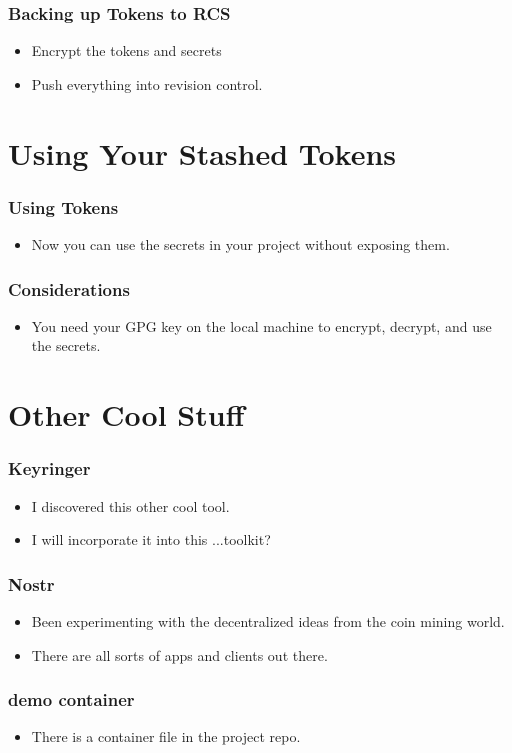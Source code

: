 \documentclass[aspectratio=169]{beamer}
\makeatletter
\def\sectionsubtitle#1{\gdef\@sectionsubtitle{#1}}
\gdef\@sectionsubtitle{}
\makeatother
\begin{document}
\begin{frame}
	\frametitle{Backing up Tokens to RCS}
	\begin{itemize}
		\item Encrypt the tokens and secrets
		\item Push everything into revision control.
	\end{itemize}
\end{frame}

\sectionsubtitle{How to Use What You Built}
\section{Using Your Stashed Tokens}

\begin{frame}
	\frametitle{Using Tokens}
	\begin{itemize}
		\item Now you can use the secrets in your project without exposing them.
	\end{itemize}
\end{frame}

\begin{frame}
	\frametitle{Considerations}
	\begin{itemize}
		\item You need your GPG key on the local machine to encrypt, decrypt, and use the secrets.
	\end{itemize}
\end{frame}

\sectionsubtitle{Where is all this going?}
\section{Other Cool Stuff}

\begin{frame}
    \frametitle{Keyringer}
    \begin{itemize}
        \item I discovered this other cool tool.
        \item I will incorporate it into this ...toolkit?
    \end{itemize}
\end{frame}

\begin{frame}
    \frametitle{Nostr}
    \begin{itemize}
        \item Been experimenting with the decentralized ideas from the coin mining world.
        \item There are all sorts of apps and clients out there.
    \end{itemize}
\end{frame}

\begin{frame}
    \frametitle{demo container}
    \begin{itemize}
        \item There is a container file in the project repo.
    \end{itemize}
\end{frame}
\end{document}
